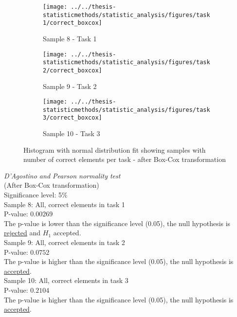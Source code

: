 \begin{figure}[h!]
	\centering
	\begin{subfigure}[b]{0.3\textwidth}
		\centering
		\texttt{[image: ../../thesis-statisticmethods/statistic\_analysis/figures/task1/correct\_boxcox]}
		\caption{Sample 8 - Task 1}
		\label{fig:correctboxcox_task1}
	\end{subfigure}
	\begin{subfigure}[b]{0.3\textwidth}
		\centering
		\texttt{[image: ../../thesis-statisticmethods/statistic\_analysis/figures/task2/correct\_boxcox]}
		\caption{Sample 9 - Task 2}
		\label{fig:correctboxcox_task2}
	\end{subfigure}
	\begin{subfigure}[b]{0.3\textwidth}
		\centering
		\texttt{[image: ../../thesis-statisticmethods/statistic\_analysis/figures/task3/correct\_boxcox]}
		\caption{Sample 10 - Task 3}
		\label{fig:correctboxcox_task3}
	\end{subfigure}
	\caption{Histogram with normal distribution fit showing samples with number of correct elements per task - after Box-Cox transformation}
\end{figure}

 \begin{center}
	\begin{tcolorbox}[box align=center,width=\textwidth-5cm]
		\centering
		\textit{D'Agostino and Pearson normality test}\\
		(After Box-Cox transformation) \\
		Significance level: 5\%  \\[0.5cm]
		
		Sample 8: All, correct elements in task 1 \\
		P-value: $0.00269$\\
		The p-value is lower than the significance level (0.05), the null hypothesis is \underline{rejected} and $H_1$ accepted.\\[0.5cm]
		
		Sample 9: All, correct elements in task 2 \\
		P-value: $0.0752$ \\
		The p-value is higher than the significance level (0.05), the null hypothesis is \underline{accepted}. \\[0.5cm]
		
		Sample 10: All, correct elements in task 3 \\
		P-value: $0.2104$ \\
		The p-value is higher than the significance level (0.05), the null hypothesis is \underline{accepted}. \\[0.5cm]
	\end{tcolorbox} 
\end{center}

